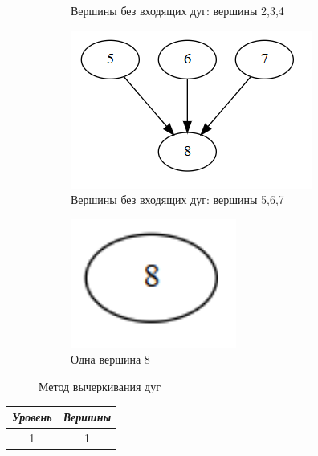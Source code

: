 \documentclass{article}
\begin{document}
\begin{enumerate}
\begin{figure}[ht]
\begin{subfigure}[b]{0.25\textwidth}
         \caption*{\small{Вершины без входящих дуг: вершины 2,3,4}}
         \label{fig:2_1}
     \end{subfigure}
     \hfill
     \begin{subfigure}[b]{0.20\textwidth}
         \centering
         \includegraphics[width=\textwidth]{attachments/2/2.png}
         \caption*{\small{Вершины без входящих дуг: вершины 5,6,7}}
         \label{fig:2_2}
        \end{subfigure}
    \hfill
     \begin{subfigure}[b]{0.1\textwidth}
         \centering
         \includegraphics[width=0.6\textwidth]{attachments/2/3.png}
         \caption*{\small{Одна вершина 8}}
         \label{fig:2_3}
     \end{subfigure}
    \caption{Метод вычеркивания дуг}
    \label{fig:2_lvls}
\end{figure}
\begin{table}[ht]
    \centering
    \begin{tabular}{c|c}
    \hline
    \textit{Уровень} & \textit{Вершины} \\ \hline
    1 & 1 \\

\end{tabular}
\end{table}
\end{enumerate}
\end{document}
